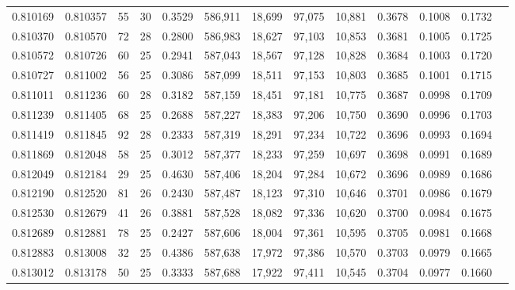 \begin{tabular}{rrrrrrrrrrrrr}
0.810169 & 0.810357 &    55 &  30 &                                     0.3529 & 586,911 &  18,699 &  97,075 &  10,881 & 0.3678 & 0.1008 & 0.1732 \\
0.810370 & 0.810570 &    72 &  28 &                                     0.2800 & 586,983 &  18,627 &  97,103 &  10,853 & 0.3681 & 0.1005 & 0.1725 \\
0.810572 & 0.810726 &    60 &  25 &                                     0.2941 & 587,043 &  18,567 &  97,128 &  10,828 & 0.3684 & 0.1003 & 0.1720 \\
0.810727 & 0.811002 &    56 &  25 &                                     0.3086 & 587,099 &  18,511 &  97,153 &  10,803 & 0.3685 & 0.1001 & 0.1715 \\
0.811011 & 0.811236 &    60 &  28 &                                     0.3182 & 587,159 &  18,451 &  97,181 &  10,775 & 0.3687 & 0.0998 & 0.1709 \\
0.811239 & 0.811405 &    68 &  25 &                                     0.2688 & 587,227 &  18,383 &  97,206 &  10,750 & 0.3690 & 0.0996 & 0.1703 \\
0.811419 & 0.811845 &    92 &  28 &                                     0.2333 & 587,319 &  18,291 &  97,234 &  10,722 & 0.3696 & 0.0993 & 0.1694 \\
0.811869 & 0.812048 &    58 &  25 &                                     0.3012 & 587,377 &  18,233 &  97,259 &  10,697 & 0.3698 & 0.0991 & 0.1689 \\
0.812049 & 0.812184 &    29 &  25 &                                     0.4630 & 587,406 &  18,204 &  97,284 &  10,672 & 0.3696 & 0.0989 & 0.1686 \\
0.812190 & 0.812520 &    81 &  26 &                                     0.2430 & 587,487 &  18,123 &  97,310 &  10,646 & 0.3701 & 0.0986 & 0.1679 \\
0.812530 & 0.812679 &    41 &  26 &                                     0.3881 & 587,528 &  18,082 &  97,336 &  10,620 & 0.3700 & 0.0984 & 0.1675 \\
0.812689 & 0.812881 &    78 &  25 &                                     0.2427 & 587,606 &  18,004 &  97,361 &  10,595 & 0.3705 & 0.0981 & 0.1668 \\
0.812883 & 0.813008 &    32 &  25 &                                     0.4386 & 587,638 &  17,972 &  97,386 &  10,570 & 0.3703 & 0.0979 & 0.1665 \\
0.813012 & 0.813178 &    50 &  25 &                                     0.3333 & 587,688 &  17,922 &  97,411 &  10,545 & 0.3704 & 0.0977 & 0.1660 \\

\end{tabular}
